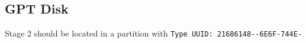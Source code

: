 \subsection{GPT Disk}

Stage 2 should be located in a partition with \texttt{Type UUID: 21686148--\allowbreak6E6F-\allowbreak744E-}\footnotemark

